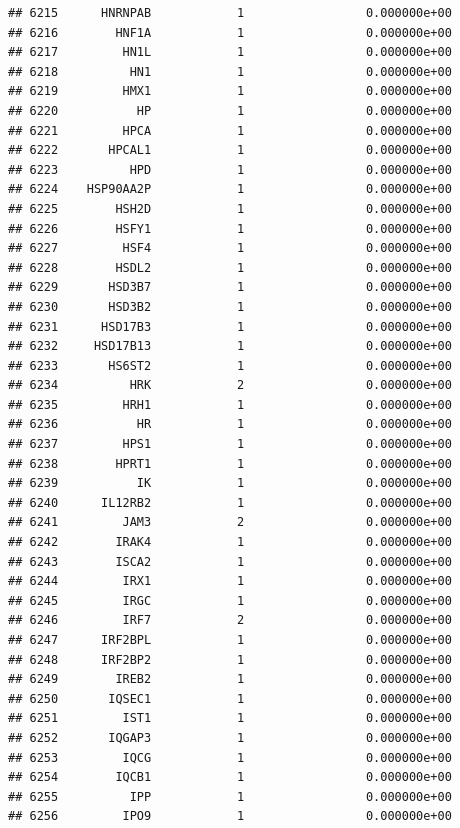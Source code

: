 \documentclass[
]{article}
\begin{document}
\begin{verbatim}
## 6215      HNRNPAB            1                 0.000000e+00
## 6216        HNF1A            1                 0.000000e+00
## 6217         HN1L            1                 0.000000e+00
## 6218          HN1            1                 0.000000e+00
## 6219         HMX1            1                 0.000000e+00
## 6220           HP            1                 0.000000e+00
## 6221         HPCA            1                 0.000000e+00
## 6222       HPCAL1            1                 0.000000e+00
## 6223          HPD            1                 0.000000e+00
## 6224    HSP90AA2P            1                 0.000000e+00
## 6225        HSH2D            1                 0.000000e+00
## 6226        HSFY1            1                 0.000000e+00
## 6227         HSF4            1                 0.000000e+00
## 6228        HSDL2            1                 0.000000e+00
## 6229       HSD3B7            1                 0.000000e+00
## 6230       HSD3B2            1                 0.000000e+00
## 6231      HSD17B3            1                 0.000000e+00
## 6232     HSD17B13            1                 0.000000e+00
## 6233       HS6ST2            1                 0.000000e+00
## 6234          HRK            2                 0.000000e+00
## 6235         HRH1            1                 0.000000e+00
## 6236           HR            1                 0.000000e+00
## 6237         HPS1            1                 0.000000e+00
## 6238        HPRT1            1                 0.000000e+00
## 6239           IK            1                 0.000000e+00
## 6240      IL12RB2            1                 0.000000e+00
## 6241         JAM3            2                 0.000000e+00
## 6242        IRAK4            1                 0.000000e+00
## 6243        ISCA2            1                 0.000000e+00
## 6244         IRX1            1                 0.000000e+00
## 6245         IRGC            1                 0.000000e+00
## 6246         IRF7            2                 0.000000e+00
## 6247      IRF2BPL            1                 0.000000e+00
## 6248      IRF2BP2            1                 0.000000e+00
## 6249        IREB2            1                 0.000000e+00
## 6250       IQSEC1            1                 0.000000e+00
## 6251         IST1            1                 0.000000e+00
## 6252       IQGAP3            1                 0.000000e+00
## 6253         IQCG            1                 0.000000e+00
## 6254        IQCB1            1                 0.000000e+00
## 6255          IPP            1                 0.000000e+00
## 6256         IPO9            1                 0.000000e+00

\end{verbatim}
\end{document}
